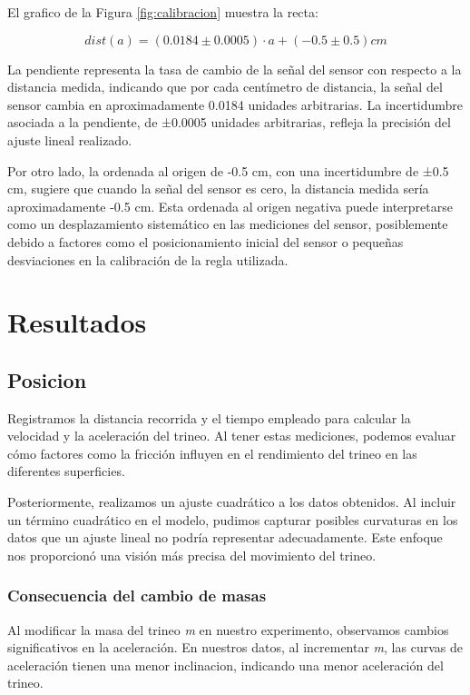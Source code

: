 \documentclass[12pt,a4]{article}
\begin{document}
El grafico de la Figura \ref{fig:calibracion} muestra la recta:

\begin{equation}
    dist(a) = (0.0184 \pm 0.0005) \cdot a + (-0.5 \pm 0.5) cm
    \label{eq:dist}
\end{equation}

La pendiente representa la tasa de cambio de la señal del sensor con respecto a la distancia medida, indicando que por cada centímetro de distancia, la señal del sensor cambia en
 aproximadamente 0.0184 unidades arbitrarias. La incertidumbre asociada a la pendiente, de ±0.0005 unidades arbitrarias, refleja la precisión del ajuste lineal realizado.


Por otro lado, la ordenada al origen de -0.5 cm, con una incertidumbre de ±0.5 cm, sugiere que cuando la señal del sensor es cero, la distancia medida sería aproximadamente -0.5 cm.
 Esta ordenada al origen negativa puede interpretarse como un desplazamiento sistemático en las mediciones del sensor, posiblemente debido a factores como el posicionamiento inicial 
 del sensor o pequeñas desviaciones en la calibración de la regla utilizada.

\section{Resultados}

\subsection{Posicion}

Registramos la distancia recorrida y el tiempo empleado para calcular la velocidad y la aceleración del trineo. Al tener estas mediciones, podemos evaluar cómo factores como la
 fricción influyen en el rendimiento del trineo en las diferentes superficies.

Posteriormente, realizamos un ajuste cuadrático a los datos obtenidos.
 Al incluir un término cuadrático en el modelo, pudimos capturar posibles curvaturas en los datos que un ajuste lineal no podría representar adecuadamente. Este enfoque nos
  proporcionó una visión más precisa del movimiento del trineo.

\subsubsection*{Consecuencia del cambio de masas}

Al modificar la masa del trineo \textit{m} en nuestro experimento, observamos cambios significativos en la aceleración. En nuestros datos, al incrementar \textit{m}, las curvas de aceleración tienen una menor inclinacion, indicando una menor aceleración del trineo.
\end{document}
